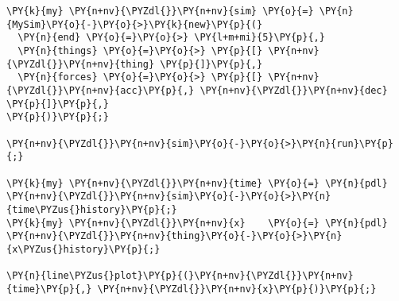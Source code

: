 \begin{Verbatim}[commandchars=\\\{\}]
\PY{k}{my} \PY{n+nv}{\PYZdl{}}\PY{n+nv}{sim} \PY{o}{=} \PY{n}{MySim}\PY{o}{-}\PY{o}{>}\PY{k}{new}\PY{p}{(}
  \PY{n}{end} \PY{o}{=}\PY{o}{>} \PY{l+m+mi}{5}\PY{p}{,}
  \PY{n}{things} \PY{o}{=}\PY{o}{>} \PY{p}{[} \PY{n+nv}{\PYZdl{}}\PY{n+nv}{thing} \PY{p}{]}\PY{p}{,}
  \PY{n}{forces} \PY{o}{=}\PY{o}{>} \PY{p}{[} \PY{n+nv}{\PYZdl{}}\PY{n+nv}{acc}\PY{p}{,} \PY{n+nv}{\PYZdl{}}\PY{n+nv}{dec} \PY{p}{]}\PY{p}{,}
\PY{p}{)}\PY{p}{;}

\PY{n+nv}{\PYZdl{}}\PY{n+nv}{sim}\PY{o}{-}\PY{o}{>}\PY{n}{run}\PY{p}{;}

\PY{k}{my} \PY{n+nv}{\PYZdl{}}\PY{n+nv}{time} \PY{o}{=} \PY{n}{pdl} \PY{n+nv}{\PYZdl{}}\PY{n+nv}{sim}\PY{o}{-}\PY{o}{>}\PY{n}{time\PYZus{}history}\PY{p}{;}
\PY{k}{my} \PY{n+nv}{\PYZdl{}}\PY{n+nv}{x}    \PY{o}{=} \PY{n}{pdl} \PY{n+nv}{\PYZdl{}}\PY{n+nv}{thing}\PY{o}{-}\PY{o}{>}\PY{n}{x\PYZus{}history}\PY{p}{;}

\PY{n}{line\PYZus{}plot}\PY{p}{(}\PY{n+nv}{\PYZdl{}}\PY{n+nv}{time}\PY{p}{,} \PY{n+nv}{\PYZdl{}}\PY{n+nv}{x}\PY{p}{)}\PY{p}{;}
\end{Verbatim}
